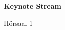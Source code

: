 \documentclass[a4paper]{article}
\begin{document}
\printGenericVSLHeader
\begin{center}
\begin{vsltext}{3cm}{3.5cm}

    \vspace{0.5cm}

    \textbf{Keynote Stream} 

    \vspace{1.5cm}

    Hörsaal 1 

\end{vsltext}

\end{center}
\end{document}
